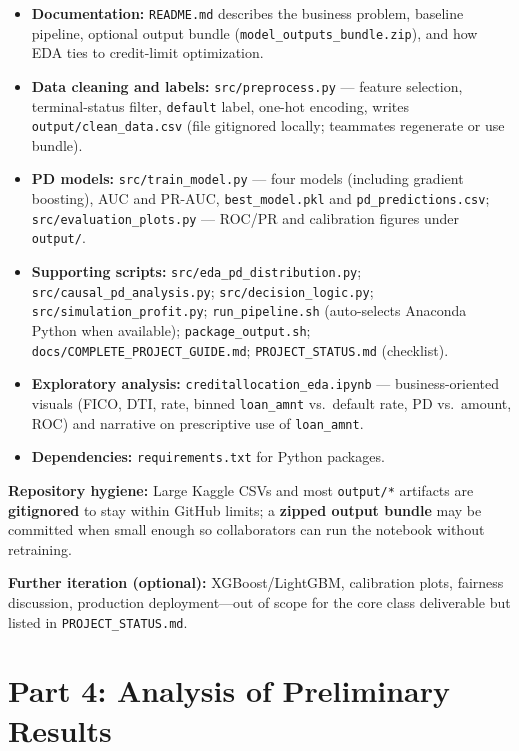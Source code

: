 \documentclass[12pt,letterpaper]{report}
\begin{document}
\begin{itemize}
    \item \textbf{Documentation:} \texttt{README.md} describes the business problem, baseline pipeline, optional output bundle (\texttt{model\_outputs\_bundle.zip}), and how EDA ties to credit-limit optimization.
    \item \textbf{Data cleaning and labels:} \texttt{src/preprocess.py} --- feature selection, terminal-status filter, \texttt{default} label, one-hot encoding, writes \texttt{output/clean\_data.csv} (file gitignored locally; teammates regenerate or use bundle).
    \item \textbf{PD models:} \texttt{src/train\_model.py} --- four models (including gradient boosting), AUC and PR-AUC, \texttt{best\_model.pkl} and \texttt{pd\_predictions.csv}; \texttt{src/evaluation\_plots.py} --- ROC/PR and calibration figures under \texttt{output/}.
    \item \textbf{Supporting scripts:} \texttt{src/eda\_pd\_distribution.py}; \texttt{src/causal\_pd\_analysis.py}; \texttt{src/decision\_logic.py}; \texttt{src/simulation\_profit.py}; \texttt{run\_pipeline.sh} (auto-selects Anaconda Python when available); \texttt{package\_output.sh}; \texttt{docs/COMPLETE\_PROJECT\_GUIDE.md}; \texttt{PROJECT\_STATUS.md} (checklist).
    \item \textbf{Exploratory analysis:} \texttt{creditallocation\_eda.ipynb} --- business-oriented visuals (FICO, DTI, rate, binned \texttt{loan\_amnt} vs.\ default rate, PD vs.\ amount, ROC) and narrative on prescriptive use of \texttt{loan\_amnt}.
    \item \textbf{Dependencies:} \texttt{requirements.txt} for Python packages.
\end{itemize}

\noindent\textbf{Repository hygiene:} Large Kaggle CSVs and most \texttt{output/*} artifacts are \textbf{gitignored} to stay within GitHub limits; a \textbf{zipped output bundle} may be committed when small enough so collaborators can run the notebook without retraining.

\noindent\textbf{Further iteration (optional):} XGBoost/LightGBM, calibration plots, fairness discussion, production deployment---out of scope for the core class deliverable but listed in \texttt{PROJECT\_STATUS.md}.

\section*{Part 4: Analysis of Preliminary Results}
\end{document}
